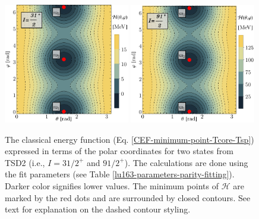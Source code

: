 \begin{figure}
    \centering
    \includegraphics[width=0.49\textwidth]{Chapters/Figures/parity-partners-plots/contour-tsd2-1.pdf}
    \includegraphics[width=0.49\textwidth]{Chapters/Figures/parity-partners-plots/contour-tsd2-2.pdf}
    \caption{The classical energy function (Eq. \ref{CEF-minimum-point-Tcore-Tsp}) expressed in terms of the polar coordinates for two states from TSD2 (i.e., $I=31/2^+$ and $91/2^+$). The calculations are done using the fit parameters (see Table \ref{lu163-parameters-parity-fitting}). Darker color signifies lower values. The minimum points of $\mathcal{H}$ are marked by the red dots and are surrounded by closed contours. See text for explanation on the dashed contour styling.}
    \label{contour-cef-polar-tsd2}
\end{figure}
